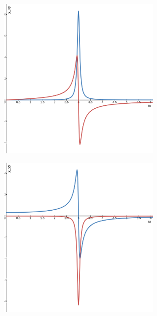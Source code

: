 \documentclass[uplatex,a4j,11pt,dvipdfmx]{jsarticle}
\makeatletter
\def\fgcaption{\def\@captype{figure}\caption}
\makeatother
\begin{document}
\begin{center}
  \includegraphics[width=8cm]{chi_xy.png}
  \fgcaption{$\chi_{xy}$のグラフ(青線:実部,赤線:虚部)}
\end{center}
\begin{center}
  \includegraphics[width=8cm]{chi_yy.png}
  \fgcaption{$\chi_{yy}$のグラフ(青線:実部,赤線:虚部)}
\end{center}
\end{document}
